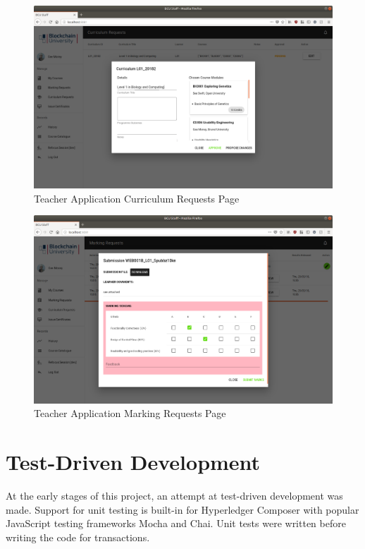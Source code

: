 \begin{figure}[!ht]
	\centering
	\includegraphics[width=1.0\textwidth]{Teacher_approvecurr}
	\caption[Teacher Application Curriculum Requests Page]
	{Teacher Application Curriculum Requests Page}
	\label{fig:Teacher_approvecurr}
\end{figure}

\begin{figure}[!ht]
	\centering
	\includegraphics[width=1.0\textwidth]{Teacher_marking}
	\caption[Teacher Application Marking Requests Page]
	{Teacher Application Marking Requests Page}
	\label{fig:Teacher_marking}
\end{figure}

\clearpage
\section{Test-Driven Development}

At the early stages of this project, an attempt at test-driven development was made. 
Support for unit testing is built-in for Hyperledger Composer with popular JavaScript testing frameworks Mocha and Chai.
Unit tests were written before writing the code for transactions.

